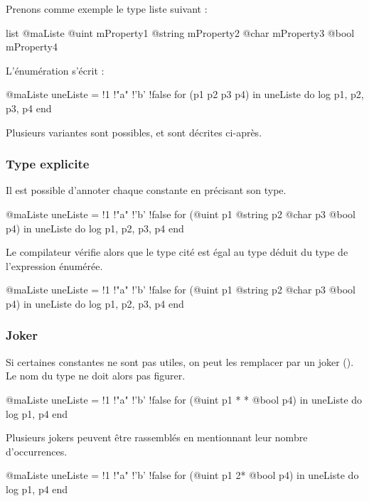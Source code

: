 {Prenons comme exemple le type liste suivant :
\begin{galgascode}
list @maListe {
  @uint mProperty1
  @string mProperty2
  @char mProperty3
  @bool mProperty4
}
\end{galgascode}

L'énumération s'écrit :
\begin{galgascode}
@maListe uneListe = {!1 !"a" !'b' !false}
for (p1 p2 p3 p4) in uneListe do
  log p1, p2, p3, p4
end
\end{galgascode}

Plusieurs variantes sont possibles, et sont décrites ci-après.

\subsubsection{Type explicite}

Il est possible d'annoter chaque constante en précisant son type.

\begin{galgascode}
@maListe uneListe = {!1 !"a" !'b' !false}
for (@uint p1 @string p2 @char p3 @bool p4) in uneListe do
  log p1, p2, p3, p4
end
\end{galgascode}

Le compilateur vérifie alors que le type cité est égal au type déduit du type de l'expression énumérée.
\begin{galgascode}
@maListe uneListe = {!1 !"a" !'b' !false}
for (@uint p1 @string p2 @char p3 @bool p4) in uneListe do
  log p1, p2, p3, p4
end
\end{galgascode}


\subsubsection{Joker}

Si certaines constantes ne sont pas utiles, on peut les remplacer par un joker (\galgas{*}). Le nom du type ne doit alors pas figurer.
\begin{galgascode}
@maListe uneListe = {!1 !"a" !'b' !false}
for (@uint p1 * * @bool p4) in uneListe do
  log p1, p4
end
\end{galgascode}

Plusieurs jokers peuvent être rassemblés en mentionnant leur nombre d'occurrences.
\begin{galgascode}
@maListe uneListe = {!1 !"a" !'b' !false}
for (@uint p1 2* @bool p4) in uneListe do
  log p1, p4
end
\end{galgascode}



}
